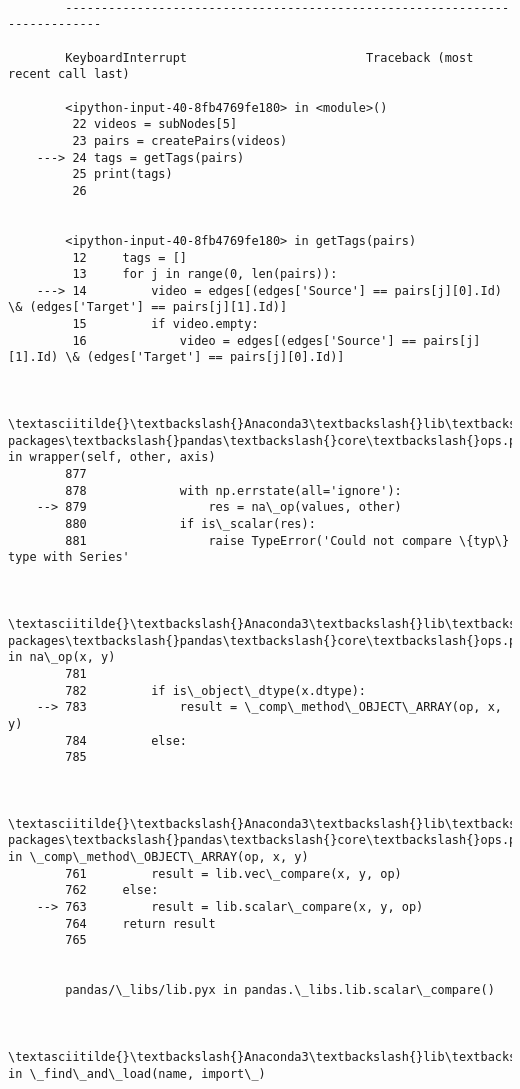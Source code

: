 \documentclass[11pt]{article}
\begin{document}
    \begin{Verbatim}[commandchars=\\\{\}]

        ---------------------------------------------------------------------------

        KeyboardInterrupt                         Traceback (most recent call last)

        <ipython-input-40-8fb4769fe180> in <module>()
         22 videos = subNodes[5]
         23 pairs = createPairs(videos)
    ---> 24 tags = getTags(pairs)
         25 print(tags)
         26 
    

        <ipython-input-40-8fb4769fe180> in getTags(pairs)
         12     tags = []
         13     for j in range(0, len(pairs)):
    ---> 14         video = edges[(edges['Source'] == pairs[j][0].Id) \& (edges['Target'] == pairs[j][1].Id)]
         15         if video.empty:
         16             video = edges[(edges['Source'] == pairs[j][1].Id) \& (edges['Target'] == pairs[j][0].Id)]
    

        \textasciitilde{}\textbackslash{}Anaconda3\textbackslash{}lib\textbackslash{}site-packages\textbackslash{}pandas\textbackslash{}core\textbackslash{}ops.py in wrapper(self, other, axis)
        877 
        878             with np.errstate(all='ignore'):
    --> 879                 res = na\_op(values, other)
        880             if is\_scalar(res):
        881                 raise TypeError('Could not compare \{typ\} type with Series'
    

        \textasciitilde{}\textbackslash{}Anaconda3\textbackslash{}lib\textbackslash{}site-packages\textbackslash{}pandas\textbackslash{}core\textbackslash{}ops.py in na\_op(x, y)
        781 
        782         if is\_object\_dtype(x.dtype):
    --> 783             result = \_comp\_method\_OBJECT\_ARRAY(op, x, y)
        784         else:
        785 
    

        \textasciitilde{}\textbackslash{}Anaconda3\textbackslash{}lib\textbackslash{}site-packages\textbackslash{}pandas\textbackslash{}core\textbackslash{}ops.py in \_comp\_method\_OBJECT\_ARRAY(op, x, y)
        761         result = lib.vec\_compare(x, y, op)
        762     else:
    --> 763         result = lib.scalar\_compare(x, y, op)
        764     return result
        765 
    

        pandas/\_libs/lib.pyx in pandas.\_libs.lib.scalar\_compare()
    

        \textasciitilde{}\textbackslash{}Anaconda3\textbackslash{}lib\textbackslash{}importlib\textbackslash{}\_bootstrap.py in \_find\_and\_load(name, import\_)
    


\end{Verbatim}
\end{document}

